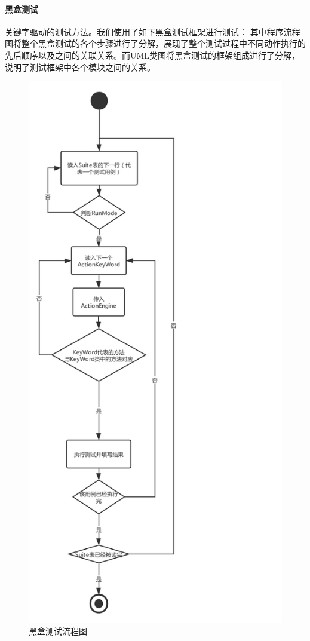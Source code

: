 \documentclass[hyperref, a4paper]{ctexart}
\let\oldparagraph\paragraph
\renewcommand{\paragraph}[1]{\oldparagraph{#1}\mbox{}}
\begin{document}
\hypertarget{ux9ed1ux76d2ux6d4bux8bd5}{%
\paragraph{黑盒测试}\label{ux9ed1ux76d2ux6d4bux8bd5}}

关键字驱动的测试方法。我们使用了如下黑盒测试框架进行测试：
其中程序流程图将整个黑盒测试的各个步骤进行了分解，展现了整个测试过程中不同动作执行的先后顺序以及之间的关联关系。而UML类图将黑盒测试的框架组成进行了分解，说明了测试框架中各个模块之间的关系。

\begin{figure}
  \centering
  \includegraphics[scale=0.5]{./assets/FlowChart.pdf}
  \caption{黑盒测试流程图}\label{1}
\end{figure}
\end{document}

